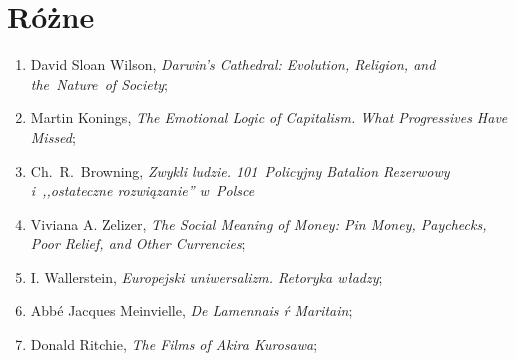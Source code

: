 \documentclass[a4paper,11pt]{article}
\begin{document}
\begin{enumerate}
\end{enumerate}





\newpage
\section{Różne}

\vspace{\spaceTwo}


\begin{enumerate}
\item David Sloan Wilson, \emph{Darwin's Cathedral: Evolution,
    Religion, and the~Nature~of Society};
\item Martin Konings, \emph{The Emotional Logic of Capitalism. What
    Progressives Have Missed};
\item Ch.~R.~Browning, \emph{Zwykli ludzie. 101~Policyjny Batalion
    Rezerwowy i~,,ostateczne rozwiązanie'' w~Polsce}
\item Viviana A. Zelizer, \emph{The Social Meaning of Money: Pin
    Money, Paychecks, Poor Relief, and Other Currencies};
\item I. Wallerstein, \emph{Europejski uniwersalizm. Retoryka władzy};
\item Abbé Jacques Meinvielle, \emph{De Lamennais ŕ Maritain};
\item Donald Ritchie, \emph{The Films of Akira Kurosawa};
\end{enumerate}
\end{document}
